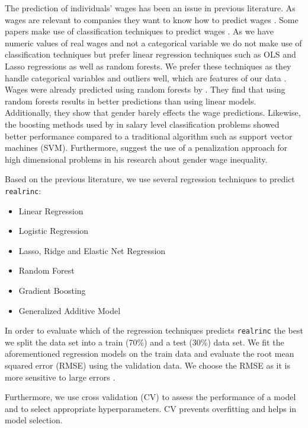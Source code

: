 \documentclass[11pt,a4paper]{article}
\begin{document}
The prediction of individuals' wages has been an issue in previous
literature. As wages are relevant to companies they want to know how to
predict wages \autocite{Chakraborti}. Some papers make use of
classification techniques to predict wages \autocite{Chakraborti}. As we
have numeric values of real wages and not a categorical variable we do
not make use of classification techniques but prefer linear regression
techniques such as OLS and Lasso regressions as well as random forests.
We prefer these techniques as they handle categorical variables and
outliers well, which are features of our data \autocite{Cutler}. Wages
were already predicted using random forests by \autocite{Eichinger}.
They find that using random forests results in better predictions than
using linear models. Additionally, they show that gender barely effects
the wage predictions. Likewise, the boosting methods used by
\autocite{Chakrabarty2018} in salary level classification problems
showed better performance compared to a traditional algorithm such as
support vector machines (SVM). Furthermore,
\textcite{BonaccoltoToepfer1612} suggest the use of a penalization
approach for high dimensional problems in his research about gender wage
inequality.

Based on the previous literature, we use several regression techniques
to predict \texttt{realrinc}:

\begin{itemize}
\item
  Linear Regression
\item
  Logistic Regression
\item
  Lasso, Ridge and Elastic Net Regression
\item
  Random Forest
\item
  Gradient Boosting
\item
  Generalized Additive Model
\end{itemize}

In order to evaluate which of the regression techniques predicts
\texttt{realrinc} the best we split the data set into a train (70\%) and
a test (30\%) data set. We fit the aforementioned regression models on
the train data and evaluate the root mean squared error (RMSE) using the
validation data. We choose the RMSE as it is more sensitive to large
errors \autocite{Arour}.

Furthermore, we use cross validation (CV) to assess the performance of a
model and to select appropriate hyperparameters. CV prevents overfitting
and helps in model selection.
\end{document}
